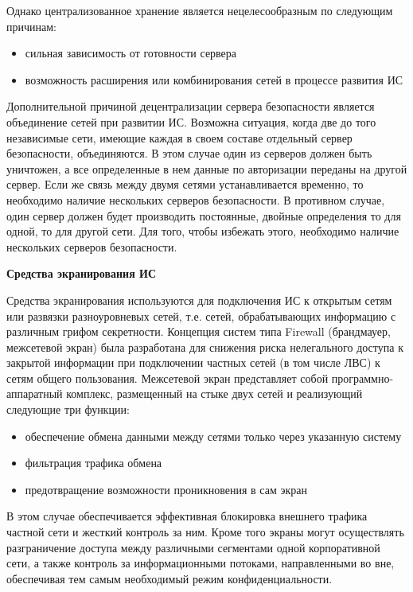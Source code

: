 Однако централизованное хранение является нецелесообразным по следующим причинам:
\begin{itemize}
    \item сильная зависимость от готовности сервера
    \item возможность расширения или комбинирования сетей в процессе развития ИС
\end{itemize}

Дополнительной причиной децентрализации сервера безопасности является объединение сетей при развитии ИС.
Возможна ситуация, когда две до того независимые сети, имеющие каждая в своем составе отдельный сервер безопасности,
объединяются. В этом случае один из серверов должен быть уничтожен, а все определенные в нем данные по авторизации
переданы на другой сервер. Если же связь между двумя сетями устанавливается временно, то необходимо наличие
нескольких серверов безопасности. В противном случае, один сервер должен будет производить постоянные,
двойные определения то для одной, то для другой сети. Для того, чтобы избежать этого, необходимо
наличие нескольких серверов безопасности.

\bigbreak
\textbf{Средства экранирования ИС}

Средства экранирования используются для подключения ИС к открытым сетям или развязки разноуровневых сетей,
т.е. сетей, обрабатывающих информацию с различным грифом секретности. Концепция систем типа Firewall
(брандмауер, межсетевой экран) была разработана для снижения риска нелегального доступа к закрытой информации при
подключении частных сетей (в том числе ЛВС) к сетям общего пользования. Межсетевой экран представляет собой
программно-аппаратный комплекс, размещенный на стыке двух сетей и реализующий следующие три функции:
\begin{itemize}
    \item обеспечение обмена данными между сетями только через указанную систему
    \item фильтрация трафика обмена
    \item предотвращение возможности проникновения в сам экран
\end{itemize}

В этом случае обеспечивается эффективная блокировка внешнего трафика частной сети и жесткий контроль за ним.
Кроме того экраны могут осуществлять разграничение доступа между различными сегментами одной корпоративной сети,
а также контроль за информационными потоками, направленными во вне, обеспечивая тем самым необходимый
режим конфиденциальности.

